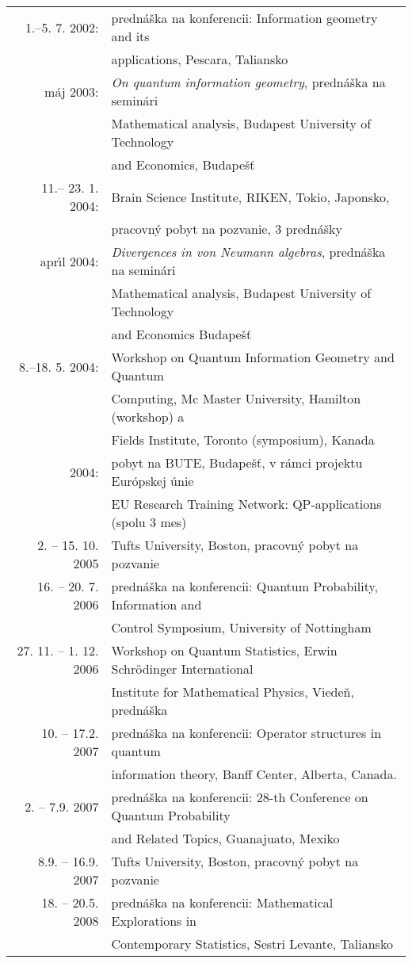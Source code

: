 \documentclass[A4paper]{article}
\begin{document}
\begin{tabular}{rl}
1.--5. 7.  2002: & predn\'a\v ska na konferencii: Information geometry and
its\\
      ~           &  applications,   Pescara, Taliansko\\
m\'aj 2003:     & {\it On quantum information geometry}, predn\'a\v ska
                           na semin\'ari\\
~              & Mathematical analysis, Budapest University of Technology\\
 ~             &  and Economics, Budape\v s\v
 t\\
11.-- 23. 1. 2004: & Brain Science Institute, RIKEN, Tokio, Japonsko,\\
~               & pracovn\'y pobyt na pozvanie, 3 predn\'a\v sky\\
 apr\'\i l 2004: &{\it Divergences in von Neumann algebras},
                predn\'a\v ska na semin\'ari\\
    ~           & Mathematical analysis, Budapest University of Technology\\
    ~           &  and Economics Budape\v s\v t\\
8.--18. 5. 2004: & Workshop on Quantum Information Geometry and Quantum\\
    ~           &  Computing, Mc Master University, Hamilton (workshop) a\\
    ~           & Fields Institute, Toronto (symposium), Kanada\\
2004:             & pobyt na BUTE, Budape\v s\v t,
 v r\'amci projektu Eur\'opskej \'unie \\
 ~      & EU Research Training Network: QP-applications (spolu 3 mes)\\
 2. -- 15. 10. 2005 &  Tufts University, Boston, pracovný pobyt na pozvanie\\
  16. -- 20. 7. 2006 & prednáška na konferencii:  Quantum Probability,
                     Information and \\
     ~           & Control Symposium, University of Nottingham\\
27. 11.  -- 1. 12. 2006  & Workshop on Quantum Statistics, Erwin Schr\"odinger
                     International\\
     ~           &Institute for Mathematical Physics, Viedeň, prednáška\\
 10. -- 17.2. 2007 & prednáška na konferencii: Operator
                    structures in quantum \\
	~	   & information theory, Banff Center, Alberta, Canada.\\
 2. -- 7.9. 2007 &  prednáška na konferencii: 28-th Conference on Quantum 
                    Probability \\
        ~         & and Related Topics, Guanajuato, Mexiko\\
 8.9. -- 16.9. 2007 &  Tufts University, Boston, pracovný pobyt na pozvanie\\
 18. -- 20.5. 2008 &  prednáška na konferencii: Mathematical Explorations in \\
      ~            &  Contemporary Statistics, Sestri Levante, Taliansko


\end{tabular}
\end{document}
